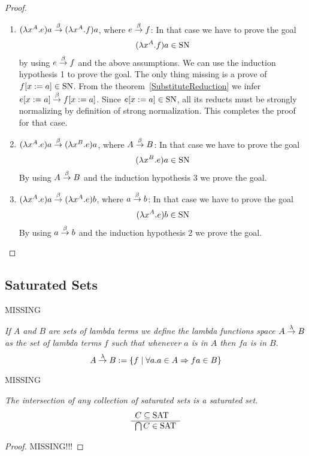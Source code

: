 \begin{theorem}
\begin{proof}
\begin{enumerate}
        \item $(\lambda x^A.e)a \stackrel{\beta}{\to} (\lambda x^A.f)a$, where $e \stackrel{\beta}{\to} f$:
            In that case we have to prove the goal
            $$
                (\lambda x^A.f)a \in \text{SN}
            $$
            by using $e \stackrel{\beta}{\to} f$ and the above assumptions. We can use the
                induction hypothesis 1 to prove the goal. The
                only thing missing is a prove of $f[x:=a] \in \text{SN}$. From the
                theorem~\ref{SubstituteReduction} we infer $e[x:=a] \stackrel{\beta}{\to}
                f[x:=a]$. Since $e[x:=a] \in \text{SN}$, all its
                reducts must be strongly normalizing by definition of strong
                normalization. This completes the proof for that case.

        \item $(\lambda x^A.e)a \stackrel{\beta}{\to} (\lambda x^B.e)a$, where $A \stackrel{\beta}{\to} B$:
            In that case we have to prove the goal
            $$
                (\lambda x^B.e)a \in \text{SN}
            $$
            By using $A \stackrel{\beta}{\to} B$ and the induction hypothesis 3 we prove the
            goal.

        \item $(\lambda x^A.e)a \stackrel{\beta}{\to} (\lambda x^A.e)b$, where $a \stackrel{\beta}{\to}
            b$: In that case we have to prove the goal
            $$
                (\lambda x^A.e)b \in \text{SN}
            $$
            By using $a \stackrel{\beta}{\to} b$ and the induction hypothesis 2 we prove the
            goal.
        \end{enumerate}
    \end{proof}
\end{theorem}



\subsection{Saturated Sets}

MISSING



\begin{definition}
    \emph{If $A$ and $B$ are sets of lambda terms we define the lambda functions
    space $A \stackrel{\lambda}{\to} B$ as the set of lambda terms $f$ such that whenever $a$
    is in $A$ then $fa$ is in $B$}.
    $$
    A \stackrel{\lambda}{\to} B := {\{f \mid \forall a. a \in A \Rightarrow fa \in B\}}
    $$
\end{definition}

MISSING

\begin{theorem}
    \label{SaturatedSetsIntersection}
    \emph{The intersection of any collection of saturated sets is a saturated
    set}.
    $$
    \begin{array}{l} 
        C \subseteq \text{SAT}
     \\ \hline 
        \bigcap C \in \text{SAT}
    \end{array}
    $$
    \begin{proof}
        MISSING!!!
    \end{proof}
\end{theorem}





